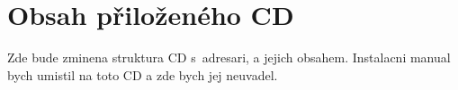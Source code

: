 \chapter{Obsah přiloženého CD}
Zde bude zminena struktura CD s~adresari, a jejich obsahem.
Instalacni manual bych umistil na toto CD a zde bych jej neuvadel.

